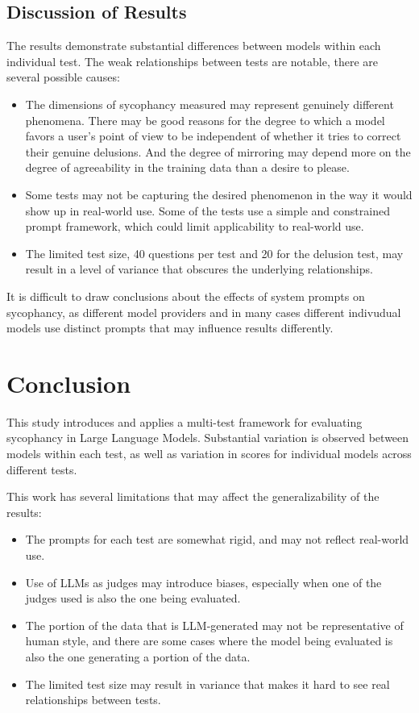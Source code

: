 \documentclass{article}
\begin{document}
\subsection{Discussion of Results}
The results demonstrate substantial differences between models within each individual test. The weak relationships between tests are notable, there are several possible causes:

\begin{itemize}
    \item The dimensions of sycophancy measured may represent genuinely different phenomena. There may be good reasons for the degree to which a model favors a user's point of view to be independent of whether it tries to correct their genuine delusions. And the degree of mirroring may depend more on the degree of agreeability in the training data than a desire to please.
    \item Some tests may not be capturing the desired phenomenon in the way it would show up in real-world use. Some of the tests use a simple and constrained prompt framework, which could limit applicability to real-world use.
    \item The limited test size, 40 questions per test and 20 for the delusion test, may result in a level of variance that obscures the underlying relationships.
\end{itemize}

It is difficult to draw conclusions about the effects of system prompts on sycophancy, as different model providers and in many cases different indivudual models use distinct prompts that may influence results differently.

\section{Conclusion}
This study introduces and applies a multi-test framework for evaluating sycophancy in Large Language Models. Substantial variation is observed between models within each test, as well as variation in scores for individual models across different tests.

This work has several limitations that may affect the generalizability of the results: 

\begin{itemize}
    \item The prompts for each test are somewhat rigid, and may not reflect real-world use.
    \item Use of LLMs as judges may introduce biases, especially when one of the judges used is also the one being evaluated.
    \item The portion of the data that is LLM-generated may not be representative of human style, and there are some cases where the model being evaluated is also the one generating a portion of the data.
    \item The limited test size may result in variance that makes it hard to see real relationships between tests.
\end{itemize}
\end{document}
